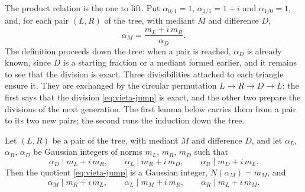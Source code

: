 The product relation is the one to lift. Put $\alpha_{0/1}=1$,
$\alpha_{1/1}=1+i$ and $\alpha_{1/0}=1$, and, for each pair $(L,R)$ of the
tree, with mediant $M$ and difference $D$,
\begin{equation}\label{eq:vieta-jump}
 \overline{\alpha_M}=\frac{m_L+i\,m_R}{\alpha_D}.
\end{equation}
The definition proceeds down the tree: when a pair is reached, $\alpha_D$ is
already known, since $D$ is a starting fraction or a mediant formed earlier,
and it remains to see that the division is exact. Three divisibilities
attached to each triangle ensure it. They are exchanged by the circular
permutation $L\to R\to D\to L$: the first says that the division
\eqref{eq:vieta-jump} is exact, and the other two prepare the divisions of the
next generation. The first lemma below carries them from a pair to its two
new pairs; the second runs the induction down the tree.

\begin{lemma}\label{lem:vieta-step}
Let $(L,R)$ be a pair of the tree, with mediant $M$ and difference $D$, and
let $\alpha_L$, $\alpha_R$, $\alpha_D$ be Gaussian integers of norms $m_L$, $m_R$,
$m_D$ such that
\begin{equation}\label{eq:three-divisibilities}
 \alpha_D\mid m_L+i\,m_R,\qquad \alpha_L\mid m_R+i\,m_D,\qquad
 \alpha_R\mid m_D+i\,m_L .
\end{equation}
Then the quotient \eqref{eq:vieta-jump} is a Gaussian integer, $N(\alpha_M)=m_M$,
and
\begin{equation}\label{eq:new-divisibilities}
 \alpha_M\mid m_R+i\,m_L,\qquad \alpha_L\mid m_M+i\,m_R,\qquad
 \alpha_R\mid m_L+i\,m_M .
\end{equation}
\end{lemma}

